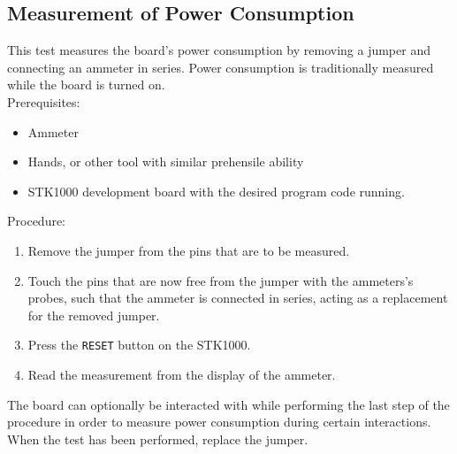 \subsection{Measurement of Power Consumption}
This test measures the board's power consumption by removing a jumper and connecting an ammeter in series.
Power consumption is traditionally measured while the board is turned on. 
\\
Prerequisites:
\begin{itemize}
	\item{Ammeter}
	\item{Hands, or other tool with similar prehensile ability}
    \item{STK1000 development board with the desired program code running.}
\end{itemize}
Procedure:
\begin{enumerate}
    \item{Remove the jumper from the pins that are to be measured.}
    \item{Touch the pins that are now free from the jumper with the ammeters's probes, such that the ammeter is connected in series, acting as a replacement for the removed jumper.}
	\item{Press the \texttt{RESET} button on the STK1000.}
    \item{Read the measurement from the display of the ammeter.}
\end{enumerate}
The board can optionally be interacted with while performing the last step of the procedure in order to measure power consumption during certain interactions.
When the test has been performed, replace the jumper.
